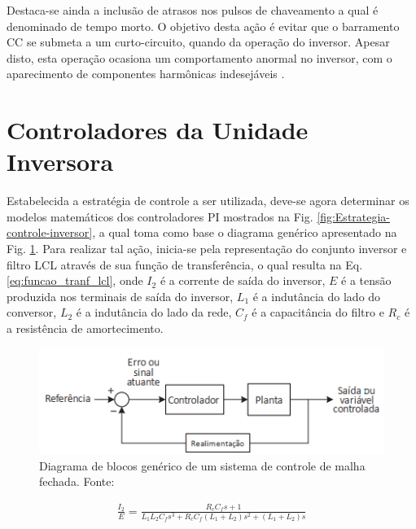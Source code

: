 Destaca-se ainda a inclusão de atrasos nos pulsos de chaveamento a qual é denominado de tempo morto. O objetivo desta ação é evitar que o barramento CC se submeta a um curto-circuito, quando da operação do inversor. Apesar disto, esta operação ocasiona um comportamento anormal no inversor, com o aparecimento de componentes harmônicas indesejáveis \cite{DissertacaoLeandro}. 

\section{Controladores da Unidade Inversora}

Estabelecida a estratégia de controle a ser utilizada, deve-se agora determinar os modelos matemáticos dos controladores PI mostrados na Fig. \ref{fig:Estrategia-controle-inversor}, a qual toma como base o diagrama genérico apresentado na Fig. \ref{fig:Controlador_Pi_Generico}. Para realizar tal ação, inicia-se pela representação do conjunto inversor e filtro LCL através de sua função de transferência, o qual resulta na Eq. \ref{eq:funcao_tranf_lcl}, onde $I_2$ é a corrente de saída do inversor, $E$ é a tensão produzida nos terminais de saída do inversor, $L_1$ é a indutância do lado do conversor, $L_2$ é a indutância do lado da rede, $C_f$ é a capacitância do filtro e $R_c$ é a resistência de amortecimento.

\begin{figure}[!hbt]
	\begin{center}
		\includegraphics[width=0.7\columnwidth]{figuras/Controlador_PI_Generico.PNG}
		\caption{Diagrama de blocos genérico de um sistema de controle de malha fechada. Fonte: \cite{DissertacaoLeandro}}
		\label{fig:Controlador_Pi_Generico}
	\end{center}
\end{figure}

\begin{align}\label{eq:funcao_tranf_lcl}
	\frac{I_2}{E} = \frac{R_cC_fs + 1}{L_1L_2C_fs^3 + R_cC_f(L_1 + L_2)s^2 + (L_1 + L_2)s}
\end{align}

